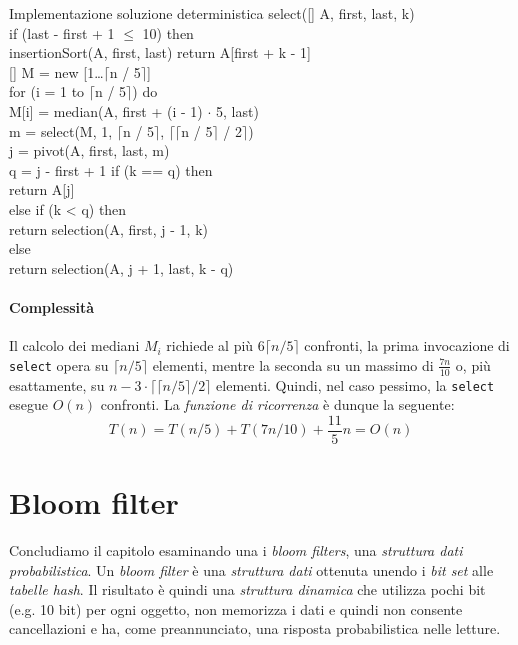 \newpage
\begin{minicode}{Implementazione soluzione deterministica}
\ind{} select([] A,  first,  last,  k)\\
    \indf if (last - first + 1 $\leq$ 10) then\\
        insertionSort(A, first, last)\hfill{}
        return A[first + k - 1]\\
    \indf{}
    \indf{}[] M = new [1\dots$\lceil$n / 5$\rceil$]\\
    \indf for (i = 1 to $\lceil$n / 5$\rceil$) do\\
        M[i] = median(A, first + (i - 1) $\cdot$ 5, last)\\
    \indf{}
    \indf{} m = select(M, 1, $\lceil$n / 5$\rceil$, $\lceil\lceil$n / 5$\rceil$ / 2$\rceil$)\\
    \indf{} j = pivot(A, first, last, m)\\
    \indf{} q = j - first + 1\hfill{}
    \indf if (k == q) then\\
        return A[j]\\
    \indf else if (k < q) then\\
        return selection(A, first, j - 1, k)\\
    \indf else\\
        return selection(A, j + 1, last, k - q)
\end{minicode}

\paragraph{Complessità}
Il calcolo dei mediani $M_i$ richiede al più $6\lceil n/5\rceil$ confronti, la
prima invocazione di \texttt{select} opera su $\lceil n/5\rceil$ elementi, mentre
la seconda su un massimo di $\frac{7n}{10}$ o, più esattamente, su $n-3\cdot\lceil
\lceil n/5\rceil/2\rceil$ elementi. Quindi, nel caso pessimo, la \texttt{select}
esegue $O(n)$ confronti. La \emph{funzione di ricorrenza} è dunque la seguente:
\[T(n)=T(n/5)+T(7n/10)+\frac{11}{5}n=O(n)\]

\section{Bloom filter}
Concludiamo il capitolo esaminando una i \emph{bloom filters}, una \emph{struttura
dati probabilistica}. Un \emph{bloom filter} è una \emph{struttura dati} ottenuta
unendo i \emph{bit set} alle \emph{tabelle hash}. Il risultato è quindi una
\emph{struttura dinamica} che utilizza pochi bit (e.g. 10 bit) per ogni oggetto,
non memorizza i dati e quindi non consente cancellazioni e ha, come preannunciato,
una risposta probabilistica nelle letture.

